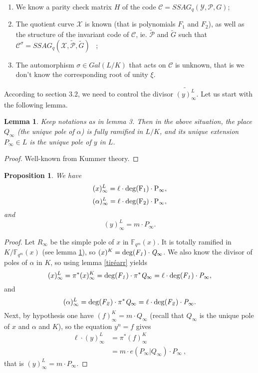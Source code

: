 \documentclass[10pt]{article}
\newtheorem{prop1}{Proposition}[]
\newtheorem{lem1}{Lemma}[]
\newcommand{\s}{\vspace{0.3cm}}
\newcommand{\cd}{\cdot}
\newcommand{\fqm}{\mathbb{F}_{q^m}}
\newcommand{\X}{\mathcal{X}}
\newcommand{\Y}{\mathcal{Y}}
\newcommand{\PR}{\mathcal{P}}
\begin{document}
\begin{enumerate}
\item We know a parity check matrix $H$ of the code $\mathcal{C} = SSAG_q(\Y,\PR,G)$;
\item The quotient curve $\X$ is known (that is polynomials $F_1$ and $F_2$), as well as the structure of the invariant code of $\mathcal{C}$, ie. $\tilde{\PR}$ and $\tilde{G}$ such that $\mathcal{C}^{\sigma} = SSAG_q(\X,\tilde{\PR},\tilde{G})$ \ ;
\item The automorphism $\sigma \in Gal(L/K)$ that acts on $\mathcal{C}$ is unknown, that is we don't know the corresponding root of unity $\xi$.
\end{enumerate}

\s


According to section $3.2$, we need to control the divisor $\widetilde{(y)^L_{\infty}}$. Let us start with the following lemma.

\s

\begin{lem1} \label{ramification}
Keep notations as in lemma 3. Then in the above situation, the place $Q_{\infty}$ (the unique pole of $\alpha$) is fully ramified in $L/K$, and its unique extension $P_{\infty} \in L$ is the unique pole of $y$ in $L$. 
\end{lem1}

\s

\begin{proof}
Well-known from Kummer theory.
\end{proof}

\s

\begin{prop1} \label{propclé}
We have
\[(x)^L_{\infty} = \ell \cd \rm{deg}(F_1) \cd P_{\infty},\]
\[(\alpha)^L_{\infty} = \ell \cd \rm{deg}(F_2) \cd P_{\infty},\]
and
\[(y)^L_{\infty} = m \cd P_{\infty}.\]
\end{prop1}

\s

\begin{proof}
Let $R_{\infty}$ be the simple pole of $x$ in $\fqm(x)$. It is totally ramified in $K/\fqm(x)$ (see lemma \ref{ramification}), so $(x)^K = \rm{deg}\it(F_1) \cd Q_{\infty}$. We also know the divisor of poles of $\alpha$ in $K$, so using lemma \ref{tiréarr} yields
\[(x)^L_{\infty} = \pi^*(x)^K_{\infty} = \rm{deg}\it(F_1) \cd \pi^*Q_{\infty} = \ell \cd \rm{deg}\it(F_1) \cd P_{\infty},\]
and
\[(\alpha)^L_{\infty} = \rm{deg}\it(F_2) \cd \pi^*Q_{\infty} = \ell \cd \rm{deg}\it(F_2) \cd P_{\infty}.\]
Next, by hypothesis one have $(f)^K_{\infty} = m \cd Q_{\infty}$ (recall that $Q_{\infty}$ is the unique pole of $x$ and $\alpha$ and $K$), so the equation $y^n=f$ gives
\begin{align*} \ell \cd (y)^L_{\infty} &= \pi^*(f)^K_{\infty} \\
&= m \cd e(P_{\infty}|Q_{\infty}) \cd P_{\infty} \ ,
\end{align*}
that is $(y)^L_{\infty} = m \cd P_{\infty}.$
\end{proof}
\end{document}
